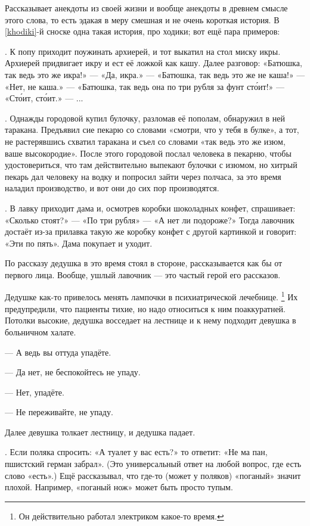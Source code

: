 \documentclass{book}
\begin{document}
Рассказывает анекдоты из своей жизни и вообще анекдоты в древнем смысле этого слова, то есть эдакая в меру смешная и не очень короткая история.
В \ref{khodiki}-й сноске одна такая история, про ходики; вот ещё пара примеров:

.
К попу приходит поужинать архиерей, и тот выкатил на стол миску икры.
Архиерей придвигает икру и ест её ложкой как кашу.
Далее разговор: 
«Батюшка, так ведь это же икра!»
--- «Да, икра.»
--- «Батюшка, так ведь это же не каша!»
--- «Нет, не каша.»
--- «Батюшка, так ведь она по три рубля за фунт ст\'{о}ит!»
--- «Ст\'{о}ит, ст\'{о}ит.» --- ...

.
Однажды городовой купил булочку, разломав её пополам, обнаружил в ней таракана.
Предъявил сие пекарю со словами «смотри, что у тебя в булке», а тот, не растерявшись схватил таракана и съел со словами «так ведь это же изюм, ваше высокородие».
После этого городовой послал человека в пекарню, чтобы удостовериться, что там действительно выпекают булочки с изюмом, но хитрый пекарь дал человеку на водку и попросил зайти через полчаса, за это время наладил производство, и вот они до сих пор производятся.

.
В лавку приходит дама и, осмотрев коробки шоколадных конфет, спрашивает: «Сколько стоят?» --- «По три рубля» --- «А нет ли подороже?»
Тогда лавочник достаёт из-за прилавка такую же коробку конфет с другой картинкой и говорит: «Эти по пять».
Дама покупает и уходит.

По рассказу дедушка в это время стоял в стороне, рассказывается как бы от первого лица.
Вообще, ушлый лавочник --- это частый герой его рассказов.

 Дедушке как-то привелось менять лампочки в психиатрической лечебнице.%
\footnote{Он действительно работал электриком какое-то время.}
Их предупредили, что пациенты тихие, но надо относиться к ним поаккуратней.
Потолки высокие, дедушка восседает на лестнице и к нему подходит девушка в больничном халате.

--- А ведь вы оттуда упадёте.

--- Да нет, не беспокойтесь не упаду.

--- Нет, упадёте.

--- Не переживайте, не упаду.

Далее девушка толкает лестницу, и дедушка падает. 

.
Если поляка спросить: «А туалет у вас есть?»
то ответит: «Не ма пан, пшистский герман забрал».
(Это универсальный ответ на любой вопрос, где есть слово «есть».)
Ещё рассказывал, что где-то (может у поляков) «поганый» значит плохой.
Например, «поганый нож» может быть просто тупым.
\end{document}
